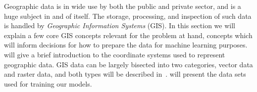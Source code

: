 Geographic data is in wide use by both the public and private sector, and is a huge subject in and of itself.
The storage, processing, and inspection of such data is handled by \textit{Geographic Information Systems} (GIS).
In this section we will explain a few core GIS concepts relevant for the problem at hand, concepts which will inform decisions for how to prepare the data for machine learning purposes.
 will give a brief introduction to the coordinate systems used to represent geographic data.
GIS data can be largely bisected into two categories, vector data and raster data, and both types will be described in~.
 will present the data sets used for training our models.
